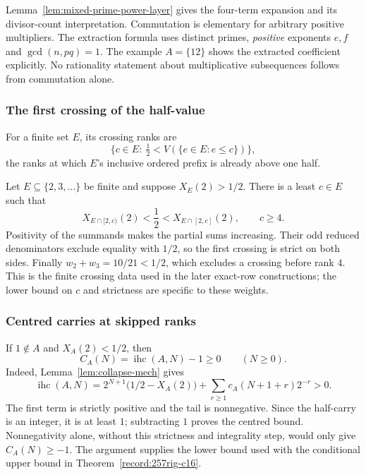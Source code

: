 \begin{prop}\label{record:257rig-i5}
Lemma~\ref{lem:mixed-prime-power-layer} gives the four-term expansion
and its divisor-count interpretation.  Commutation is elementary
for arbitrary positive multipliers.  The extraction formula uses
distinct primes, \emph{positive} exponents $e,f$ and $\gcd(n,pq)=1$.
The example $A=\{12\}$ shows the extracted coefficient explicitly.
No rationality statement about multiplicative subsequences follows
from commutation alone.
\end{prop}

\subsubsection*{The first crossing of the half-value}

\begin{defn}\label{record:257bm-i-cross}
For a finite set $E$, its crossing ranks are
\[
\bigl\{c\in E:\ \tfrac12 < \ensuremath{V}(\{e\in E:e\le c\})\bigr\},
\]
the ranks at which $E$'s inclusive ordered prefix is already above one half.
\par\noindent   {}
\end{defn}

\begin{thm}\label{record:257bm-i-cross2}
Let $E\subseteq\{2,3,\ldots\}$ be finite and suppose $X_E(2)>1/2$.
There is a least $c\in E$ such that
\[
 X_{E\cap[2,c)}(2)<\frac12
       <X_{E\cap[2,c]}(2),\qquad c\ge4.
\]
Positivity of the summands makes the partial sums increasing.  Their
odd reduced denominators exclude equality with $1/2$, so the first
crossing is strict on both sides.  Finally
$w_2+w_3=10/21<1/2$, which excludes a crossing before rank $4$.
This is the finite crossing data used in the later exact-row
constructions; the lower bound on $c$ and strictness are specific
to these weights.
\end{thm}

\subsubsection*{Centred carries at skipped ranks}

\begin{thm}\label{record:257hg-i6}
If $1\notin A$ and $X_A(2)<1/2$, then
\[
 C_A(N)=\operatorname{ihc}(A,N)-1\ge0\qquad(N\ge0).
\]
Indeed, Lemma~\ref{lem:collapse-mech} gives
\[
 \operatorname{ihc}(A,N)
 =2^{N+1}\bigl(1/2-X_A(2)\bigr)
     +\sum_{r\ge1}c_A(N+1+r)2^{-r}>0.
\]
The first term is strictly positive and the tail is nonnegative.
Since the half-carry is an integer, it is at least $1$; subtracting
$1$ proves the centred bound.  Nonnegativity alone, without this
strictness and integrality step, would only give $C_A(N)\ge-1$.
The argument supplies the lower bound used with the conditional
upper bound in Theorem~\ref{record:257rig-c16}.
\end{thm}

